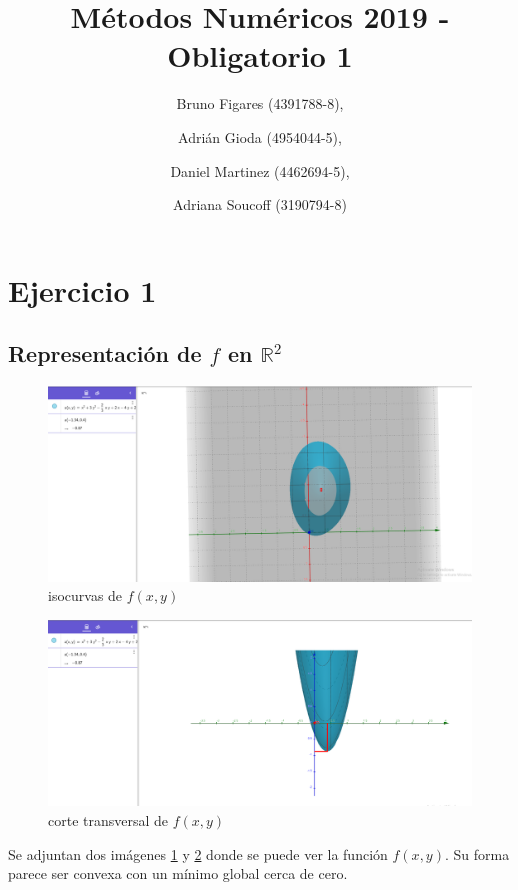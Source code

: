 \documentclass{endm}
\begin{document}
\begin{frontmatter}

\title{Métodos Numéricos 2019 - Obligatorio 1}

\author{Bruno Figares (4391788-8),}
\author{Adrián Gioda (4954044-5),}
\author{Daniel Martinez (4462694-5),}
\author{Adriana Soucoff (3190794-8)}

\address{Instituto de Matem\'atica y Estad\'istica\\ Facultad de Ingenier\'ia. Universidad de la Rep\'ublica\\ Montevideo, Uruguay}

\end{frontmatter}


\section{Ejercicio 1}
\subsection{Representación de $f$ en $\mathbb{R}^2$}
\begin{figure}[htbp]
  \includegraphics[width=\linewidth]{ej_1_1_1.png}
  \caption{isocurvas de $f(x,y)$}
  \label{fig:1.1.1}
\end{figure}
\begin{figure}[htbp]
  \includegraphics[width=\linewidth]{ej_1_1_2.png}
  \caption{corte transversal de $f(x,y)$}
  \label{fig:1.1.2}
\end{figure}
Se adjuntan dos imágenes  \ref{fig:1.1.1} y \ref{fig:1.1.2}  donde se puede ver la función $f(x,y)$. Su forma parece ser convexa con un mínimo global cerca de cero.
\end{document}
